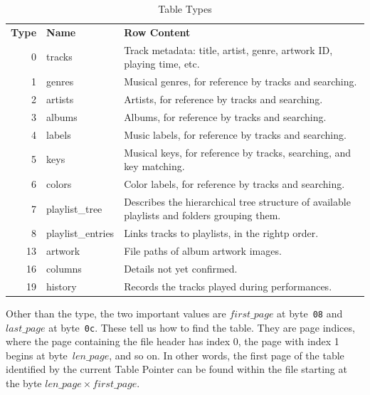 \documentclass[11pt]{article}
\begin{document}
\begin{longtabu}{rlX}
  \toprule
  {\bfseries Type} & {\bfseries Name} & {\bfseries Row Content} \endhead

  \bottomrule \\
  \caption{Table Types} \endfoot

  0 & tracks & Track metadata: title, artist, genre, artwork ID,
  playing time, etc. \label{table:tableTypes} \\

  1 & genres & Musical genres, for reference by tracks and searching.
  \\

  2 & artists & Artists, for reference by tracks and searching. \\

  3 & albums & Albums, for reference by tracks and searching. \\

  4 & labels & Music labels, for reference by tracks and searching. \\

  5 & keys & Musical keys, for reference by tracks, searching, and key
  matching. \\

  6 & colors & Color labels, for reference by tracks and searching. \\

  7 & playlist\_tree & Describes the hierarchical tree structure of
  available playlists and folders grouping them. \\

  8 & playlist\_entries & Links tracks to playlists, in the rightp
  order. \\

  13 & artwork & File paths of album artwork images. \\

  16 & columns & Details not yet confirmed. \\

  19 & history & Records the tracks played during performances. \\

\end{longtabu}

Other than the type, the two important values are $first\_page$ at
byte~{\tt 08} and $last\_page$ at byte~{\tt 0c}. These tell us how to
find the table. They are page indices, where the page containing the
file header has index 0, the page with index 1 begins at
byte~$len\_page$, and so on. In other words, the first page of the
table identified by the current Table Pointer can be found within the
file starting at the byte $len\_page \times first\_page$.
\end{document}
